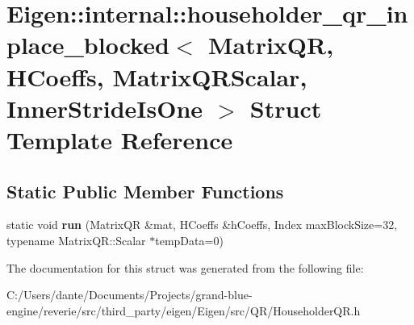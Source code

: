 \hypertarget{struct_eigen_1_1internal_1_1householder__qr__inplace__blocked}{}\section{Eigen\+::internal\+::householder\+\_\+qr\+\_\+inplace\+\_\+blocked$<$ Matrix\+QR, H\+Coeffs, Matrix\+Q\+R\+Scalar, Inner\+Stride\+Is\+One $>$ Struct Template Reference}
\label{struct_eigen_1_1internal_1_1householder__qr__inplace__blocked}
\subsection*{Static Public Member Functions}
\begin{DoxyCompactItemize}
\item 
\mbox{\label{struct_eigen_1_1internal_1_1householder__qr__inplace__blocked_adf1b919ae5f46e4cb6b89a2de673257f}} 
static void {\bfseries run} (Matrix\+QR \&mat, H\+Coeffs \&h\+Coeffs, Index max\+Block\+Size=32, typename Matrix\+Q\+R\+::\+Scalar $\ast$temp\+Data=0)
\end{DoxyCompactItemize}


The documentation for this struct was generated from the following file\+:\begin{DoxyCompactItemize}
\item 
C\+:/\+Users/dante/\+Documents/\+Projects/grand-\/blue-\/engine/reverie/src/third\+\_\+party/eigen/\+Eigen/src/\+Q\+R/Householder\+Q\+R.\+h\end{DoxyCompactItemize}
